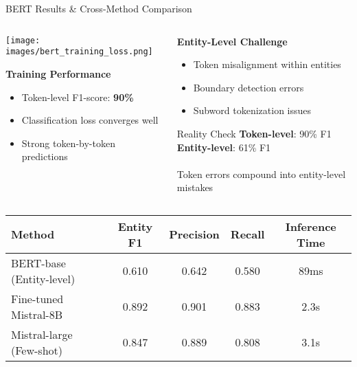 \documentclass[aspectratio=169]{beamer}
\begin{document}
\begin{frame}{BERT Results \& Cross-Method Comparison}
\begin{columns}
\begin{column}{0.6\textwidth}
\begin{center}
\texttt{[image: images/bert\_training\_loss.png]}
\caption{BERT Training: Token-level Loss}
\end{center}

\textbf{Training Performance}
\begin{itemize}
\item Token-level F1-score: \textbf{90\%}
\item Classification loss converges well
\item Strong token-by-token predictions
\end{itemize}
\end{column}
\begin{column}{0.4\textwidth}
\textbf{Entity-Level Challenge}
\begin{itemize}
\item Token misalignment within entities
\item Boundary detection errors
\item Subword tokenization issues
\end{itemize}

\vspace{0.3cm}
\begin{alertblock}{Reality Check}
\textbf{Token-level}: 90\% F1\\
\textbf{Entity-level}: 61\% F1\\
\\
Token errors compound into entity-level mistakes
\end{alertblock}
\end{column}
\end{columns}

\vspace{0.3cm}
\begin{table}[h]
\centering
\scriptsize
\begin{tabular}{lcccc}
\toprule
\textbf{Method} & \textbf{Entity F1} & \textbf{Precision} & \textbf{Recall} & \textbf{Inference Time} \\
\midrule
BERT-base (Entity-level) & 0.610 & 0.642 & 0.580 & 89ms \\
Fine-tuned Mistral-8B & 0.892 & 0.901 & 0.883 & 2.3s \\
Mistral-large (Few-shot) & 0.847 & 0.889 & 0.808 & 3.1s \\
\bottomrule
\end{tabular}
\end{table}
\end{frame}
\end{document}
